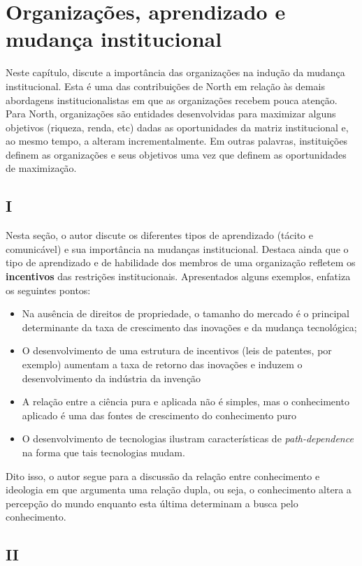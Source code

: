 \section*{Organizações, aprendizado e mudança institucional}

Neste capítulo, \autor discute a importância das organizações na indução da mudança institucional. Esta é uma das contribuições de North em relação às demais abordagens institucionalistas em que as organizações recebem pouca atenção. Para North, organizações são entidades desenvolvidas para maximizar alguns objetivos (riqueza, renda, etc) dadas as oportunidades da matriz institucional e, ao mesmo tempo, a alteram incrementalmente. Em outras palavras, instituições definem as organizações e seus objetivos uma vez que definem as oportunidades de maximização.

\subsection*{I}


Nesta seção, o autor discute os diferentes tipos de aprendizado (tácito e comunicável) e sua importância na mudanças institucional. Destaca ainda que o tipo de aprendizado e de habilidade dos membros de uma organização refletem os \textbf{incentivos} das restrições institucionais. Apresentados alguns exemplos, enfatiza os seguintes pontos:
\begin{itemize}
	\item Na ausência de direitos de propriedade, o tamanho do mercado é o principal determinante da taxa de crescimento das inovações e da mudança tecnológica;
	\item O desenvolvimento de uma estrutura de incentivos (leis de patentes, por exemplo) aumentam a taxa de retorno das inovações e induzem o desenvolvimento da indústria da invenção
	\item A relação entre a ciência pura e aplicada não é simples, mas o conhecimento aplicado é uma das fontes de crescimento do conhecimento puro
	\item O desenvolvimento de tecnologias ilustram características de \textit{path-dependence} na forma que tais tecnologias mudam.
\end{itemize}
Dito isso, o autor segue para a discussão da relação entre conhecimento e ideologia em que argumenta uma relação dupla, ou seja, o conhecimento altera a percepção do mundo enquanto esta última  determinam a busca pelo conhecimento.

\subsection*{II}

